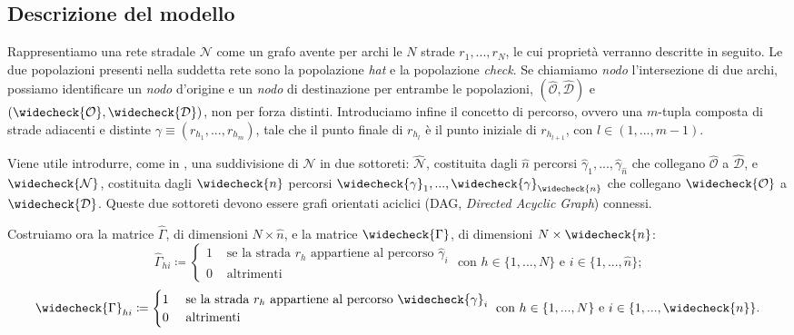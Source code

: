 \subsection{Descrizione del modello}
\label{subsec:DescModello}
Rappresentiamo una rete stradale $\mathcal{N}$ come un grafo avente per archi le $N$ strade $r_1,...,r_N$,
le cui proprietà verranno descritte in seguito. Le due popolazioni presenti nella suddetta rete sono 
la popolazione \textit{hat} e la popolazione \textit{check}. Se chiamiamo \textit{nodo} l'intersezione di due archi, possiamo identificare un \textit{nodo} d'origine e un \textit{nodo} di destinazione per entrambe le popolazioni,
$(\widehat{\mathcal{O}}, \widehat{\mathcal{D}})$ e $(\widecheck{\mathcal{O}}, \widecheck{\mathcal{D}})$, non per forza distinti.
Introduciamo infine il concetto di percorso, ovvero una $m$-tupla composta di strade adiacenti e distinte $\gamma\equiv(r_{h_1},...,r_{h_m})$, 
tale che il punto finale di $r_{h_l}$ è il punto iniziale di $r_{h_{l+1}}$, con $l\in(1,...,m-1)$.

Viene utile introdurre, come in \cite[Cap. 2]{MR4911797}, una suddivisione di $\mathcal{N}$ in due sottoreti: $\widehat{\mathcal{N}}$,
costituita dagli $\widehat{n}$ percorsi $\widehat{\gamma}_1,...,\widehat{\gamma}_{\widehat{n}}$ che collegano $\widehat{\mathcal{O}}$ a $\widehat{\mathcal{D}}$, e
$\widecheck{\mathcal{N}}$, costituita dagli $\widecheck{n}$ percorsi $\widecheck{\gamma}_1,...,\widecheck{\gamma}_{\widecheck{n}}$ che collegano $\widecheck{\mathcal{O}}$ a $\widecheck{\mathcal{D}}$.
Queste due sottoreti devono essere grafi orientati aciclici (DAG, \textit{Directed Acyclic Graph}) connessi.

Costruiamo ora la matrice $\widehat{\Gamma}$, di dimensioni $N\times\widehat{n}$, e la matrice $\widecheck{\Gamma}$, di dimensioni $N\times\widecheck{n}$:
\[
\widehat{\Gamma}_{hi} \coloneqq
\begin{cases}
    1 &\text{ se la strada } r_h \text{ appartiene al percorso } \widehat{\gamma}_i\\
    0 &\text{ altrimenti}
\end{cases} 
\text{ con } h\in\{1,...,N\} \text{ e } i\in\{1,...,\widehat{n}\}\text{;}
\]
\[
\widecheck{\Gamma}_{hi} \coloneqq
\begin{cases}
    1 &\text{ se la strada } r_h \text{ appartiene al percorso } \widecheck{\gamma}_i\\
    0 &\text{ altrimenti}
\end{cases} 
\text{ con } h\in\{1,...,N\} \text{ e } i\in\{1,...,\widecheck{n}\}\text{.}
\]

